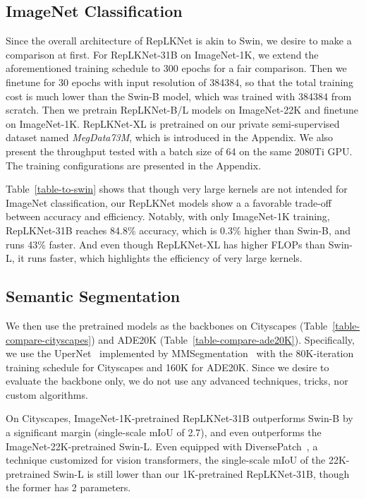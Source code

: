 \documentclass[10pt,twocolumn,letterpaper]{article}
\begin{document}
	
	\subsection{ImageNet Classification}\label{sect-imgnet}
	
	Since the overall architecture of RepLKNet is akin to Swin, we desire to make a comparison at first. For RepLKNet-31B on ImageNet-1K, we extend the aforementioned training schedule to 300 epochs for a fair comparison. Then we finetune for 30 epochs with input resolution of 384384, so that the total training cost is much lower than the Swin-B model, which was trained with 384384 from scratch. Then we pretrain RepLKNet-B/L models on ImageNet-22K and finetune on ImageNet-1K. RepLKNet-XL is pretrained on our private semi-supervised dataset named \emph{MegData73M}, which is introduced in the Appendix. We also present the throughput tested with a batch size of 64 on the same 2080Ti GPU. The training configurations are presented in the Appendix.
	
	Table~\ref{table-to-swin} shows that though very large kernels are not intended for ImageNet classification, our RepLKNet models show a a favorable trade-off between accuracy and efficiency. Notably, with only ImageNet-1K training, RepLKNet-31B reaches 84.8\% accuracy, which is 0.3\% higher than Swin-B, and runs 43\% faster. And even though RepLKNet-XL has higher FLOPs than Swin-L, it runs faster, which highlights the efficiency of very large kernels.


	
	\subsection{Semantic Segmentation}
	
	We then use the pretrained models as the backbones on Cityscapes (Table~\ref{table-compare-cityscapes}) and ADE20K (Table~\ref{table-compare-ade20K}). Specifically, we use the UperNet~\cite{xiao2018unified} implemented by MMSegmentation~\cite{mmseg2020} with the 80K-iteration training schedule for Cityscapes and 160K for ADE20K. Since we desire to evaluate the backbone only, we do not use any advanced techniques, tricks, nor custom algorithms. 
	
	On Cityscapes, ImageNet-1K-pretrained RepLKNet-31B outperforms Swin-B by a significant margin (single-scale mIoU of 2.7), and even {outperforms the ImageNet-22K-pretrained Swin-L}. Even equipped with DiversePatch~\cite{gong2021improve}, a technique customized for vision transformers, the single-scale mIoU of the 22K-pretrained Swin-L is still lower than our 1K-pretrained RepLKNet-31B, though the former has 2 parameters.
	
\end{document}

